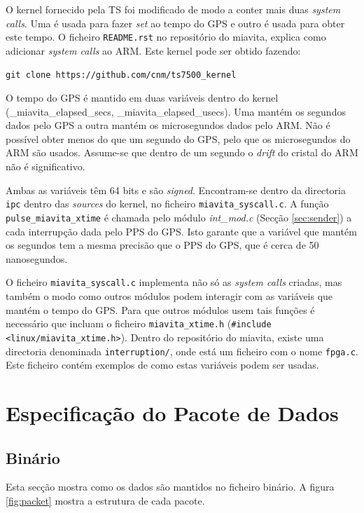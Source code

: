 \documentclass[10pt,a4paper,oneside]{book}
\begin{document}
O kernel fornecido pela TS foi modificado de modo a conter mais duas \emph{system calls}. Uma é usada para fazer \emph{set} ao tempo do GPS e outro é usada para obter este tempo. O ficheiro {\tt README.rst} no repositório do miavita, explica como adicionar \emph{system calls} ao ARM. Este kernel pode ser obtido fazendo:

\begin{center}
{\tt git clone https://github.com/cnm/ts7500\_kernel}
\end{center}

O tempo do GPS é mantido em duas variáveis dentro do kernel (\_miavita\_elapsed\_secs, \_miavita\_elapsed\_usecs). Uma mantém os segundos dados pelo GPS a outra mantém os microsegundos dados pelo ARM. Não é possível obter menos do que um segundo do GPS, pelo que os microsegundos do ARM são usados. Assume-se que dentro de um segundo o \emph{drift} do cristal do ARM não é significativo.

Ambas as variáveis têm 64 bits e são \emph{signed}. Encontram-se dentro da directoria {\tt ipc} dentro das \emph{sources} do kernel, no ficheiro {\tt miavita\_syscall.c}. A função {\tt pulse\_miavita\_xtime} é chamada pelo módulo \emph{int\_mod.c} (Secção \ref{sec:sender}) a cada interrupção dada pelo PPS do GPS. Isto garante que a variável que mantém os segundos tem a mesma precisão que o PPS do GPS, que é cerca de 50 nanosegundos.

O ficheiro {\tt miavita\_syscall.c} implementa não só as \emph{system calls} criadas, mas também o modo como outros módulos podem interagir com as variáveis que mantém o tempo do GPS. Para que outros módulos usem tais funções é necessário que incluam o ficheiro {\tt miavita\_xtime.h} ({\tt \#include <linux/miavita\_xtime.h>}). Dentro do repositório do miavita, existe uma directoria denominada {\tt interruption/}, onde está um ficheiro com o nome {\tt fpga.c}. Este ficheiro contém exemplos de como estas variáveis podem ser usadas.

\chapter{Especificação do Pacote de Dados}\label{sec:packet_specification}

  \section{Binário}

	Esta secção mostra como os dados são mantidos no ficheiro binário. A figura \ref{fig:packet} mostra a estrutura de cada pacote.
	
\end{document}
